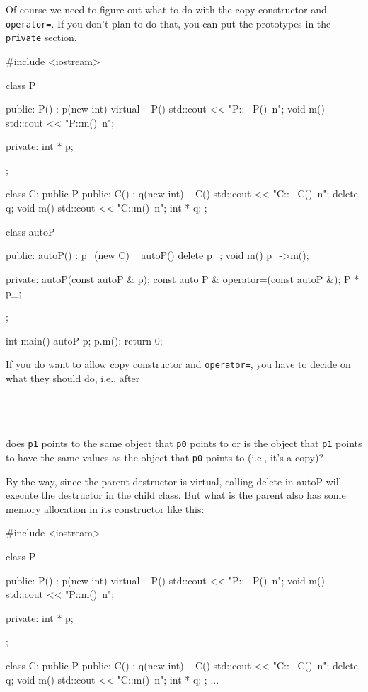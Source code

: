 \begin{console}
Of course we need to figure out what to do with the copy constructor and \texttt{operator=}. If you don't plan to do that, you can put the prototypes in the \texttt{private} section.

\begin{console}
#include <iostream>

class P
{
public:
     P() : p(new int) {}
     virtual ~ P() { std::cout << "P::~ P()\ n"; }
     void m() { std::cout << "P::m()\ n"; }
     
private:
     int * p;
};

class C: public P
{
public:
     C() : q(new int) {}
     ~ C() { std::cout << "C::~ C()\ n"; delete q; }
     void m() { std::cout << "C::m()\ n"; }
     int * q;
};

class autoP
{
public:
     autoP()
         : p_(new C)
     {}
     ~ autoP()
     { delete p_; }
     void m() { p_->m(); }
     
private:
     autoP(const autoP & p);
     const auto P & operator=(const autoP &);
     P * p_;
};

int main()
{   
    autoP p;
    p.m();
    return 0;
}
\end{console}

If you do want to allow copy constructor and \texttt{operator=}, you have to decide on what they should do, i.e., after

\\
\\
\\

does \texttt{p1} points to the same object that \texttt{p0} points to or is the object that \texttt{p1} points to have the same values as the object that \texttt{p0} points to (i.e., it's a copy)?

By the way, since the parent destructor is virtual, calling delete in autoP will execute the destructor in the child class. But what is the parent also has some memory allocation in its constructor like this:

\begin{console}
#include <iostream>

class P
{
public:
     P() : p(new int) {}
     virtual ~ P() { std::cout << "P::~ P()\ n"; }
     void m() { std::cout << "P::m()\ n"; }

private:
     int * p;
};

class C: public P
{
public:
     C() : q(new int) {}
     ~ C() { std::cout << "C::~ C()\ n"; delete q; }
     void m() { std::cout << "C::m()\ n"; }
     int * q;
};
... 
\end{console}


\end{console}
